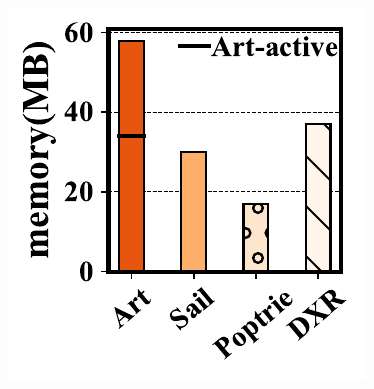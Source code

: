 \documentclass[a4paper]{article}
\begin{document}
    \begin{figure}[htbp]
        \includegraphics{../result/example7.pdf}
    \end{figure}
\end{document}
